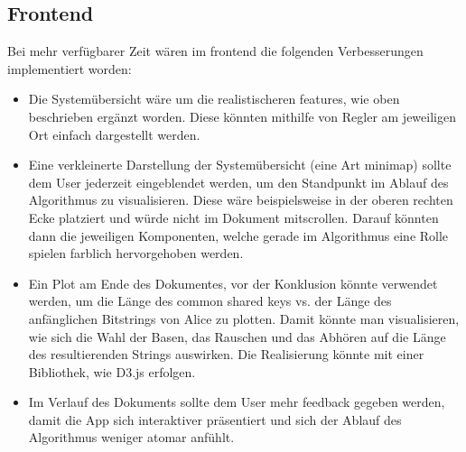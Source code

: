\documentclass[a4paper,10.2pt,pdftex]{scrartcl}%
\begin{document}
\subsection{Frontend}
Bei mehr verfügbarer Zeit wären im frontend die folgenden Verbesserungen implementiert worden:
\begin{itemize}
\item Die Systemübersicht wäre um die realistischeren features, wie oben beschrieben ergänzt worden. Diese könnten mithilfe von Regler am jeweiligen Ort einfach dargestellt werden.
\item Eine verkleinerte Darstellung der Systemübersicht (eine Art minimap) sollte dem User jederzeit eingeblendet werden, um den Standpunkt im Ablauf des Algorithmus zu visualisieren. Diese wäre beispielsweise in der oberen rechten Ecke platziert und würde nicht im Dokument mitscrollen. Darauf könnten dann die jeweiligen Komponenten, welche gerade im Algorithmus eine Rolle spielen farblich hervorgehoben werden.
\item Ein Plot am Ende des Dokumentes, vor der Konklusion könnte verwendet werden, um die Länge des common shared keys vs. der Länge des anfänglichen Bitstrings von Alice zu plotten. Damit könnte man visualisieren, wie sich die Wahl der Basen, das Rauschen und das Abhören auf die Länge des resultierenden Strings auswirken. Die Realisierung könnte mit einer Bibliothek, wie D3.js erfolgen.
\item Im Verlauf des Dokuments sollte dem User mehr feedback gegeben werden, damit die App sich interaktiver präsentiert und sich der Ablauf des Algorithmus weniger atomar anfühlt.
\end{itemize}


\newpage
\nocite{*}	

 


\appendix




\end{document}
